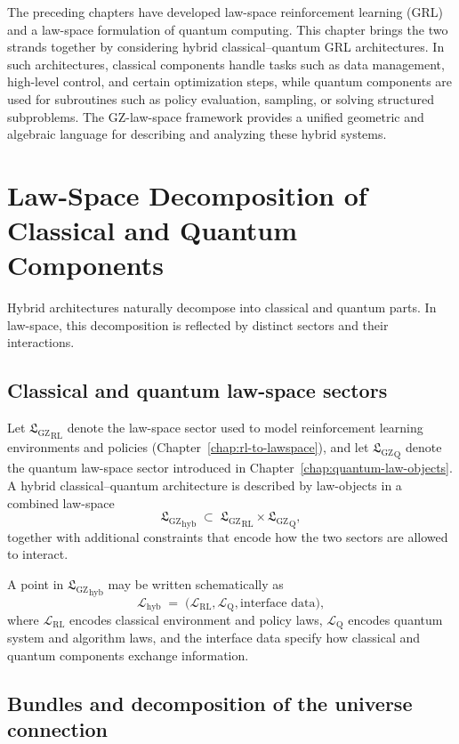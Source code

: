 \documentclass[11pt]{book}
\newcommand{\GZLS}{\ensuremath{\mathfrak{L}_{\mathrm{GZ}}}}
\theoremstyle{plain}
\theoremstyle{definition}
\theoremstyle{remark}
\begin{document}
The preceding chapters have developed law-space reinforcement
learning (GRL) and a law-space formulation of quantum computing.
This chapter brings the two strands together by considering hybrid
classical–quantum GRL architectures. In such architectures, classical
components handle tasks such as data management, high-level control,
and certain optimization steps, while quantum components are used
for subroutines such as policy evaluation, sampling, or solving
structured subproblems. The GZ-law-space framework provides a
unified geometric and algebraic language for describing and
analyzing these hybrid systems.

\section{Law-Space Decomposition of Classical and Quantum Components}
\label{sec:lawspace-decomposition-cq}


Hybrid architectures naturally decompose into classical and quantum
parts. In law-space, this decomposition is reflected by distinct
sectors and their interactions.

\subsection*{Classical and quantum law-space sectors}

Let ${\GZLS}_{\mathrm{RL}}$ denote the law-space sector used to model
reinforcement learning environments and policies
(Chapter~\ref{chap:rl-to-lawspace}), and let
${\GZLS}_{\mathrm{Q}}$ denote the quantum law-space sector introduced
in Chapter~\ref{chap:quantum-law-objects}. A hybrid
classical–quantum architecture is described by law-objects in a
combined law-space
\[
   {\GZLS}_{\mathrm{hyb}}
   \;\subset\;
   {\GZLS}_{\mathrm{RL}} \times {\GZLS}_{\mathrm{Q}},
\]
together with additional constraints that encode how the two sectors
are allowed to interact.

A point in ${\GZLS}_{\mathrm{hyb}}$ may be written schematically as
\[
   \mathcal{L}_{\mathrm{hyb}}
   \;=\;
   \bigl(\mathcal{L}_{\mathrm{RL}},
          \mathcal{L}_{\mathrm{Q}},
          \text{interface data}\bigr),
\]
where $\mathcal{L}_{\mathrm{RL}}$ encodes classical environment and
policy laws, $\mathcal{L}_{\mathrm{Q}}$ encodes quantum system and
algorithm laws, and the interface data specify how classical and
quantum components exchange information.

\subsection*{Bundles and decomposition of the universe connection}
\end{document}
